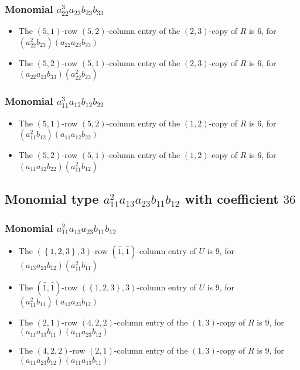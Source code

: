\documentclass{article}
\begin{document}
\subsubsection{Monomial $ a_{22}^{3} a_{23} b_{23} b_{33} $}

\begin{itemize}
\item The $(5, 1)$-row $(5, 2)$-column entry of the $ \left(2, 3\right) $-copy of $R$ is $ 6 $, for $( a_{22}^{2} b_{23} )( a_{22} a_{23} b_{33} )$ 
\item The $(5, 2)$-row $(5, 1)$-column entry of the $ \left(2, 3\right) $-copy of $R$ is $ 6 $, for $( a_{22} a_{23} b_{33} )( a_{22}^{2} b_{23} )$ 
\end{itemize}
\subsubsection{Monomial $ a_{11}^{3} a_{12} b_{12} b_{22} $}

\begin{itemize}
\item The $(5, 1)$-row $(5, 2)$-column entry of the $ \left(1, 2\right) $-copy of $R$ is $ 6 $, for $( a_{11}^{2} b_{12} )( a_{11} a_{12} b_{22} )$ 
\item The $(5, 2)$-row $(5, 1)$-column entry of the $ \left(1, 2\right) $-copy of $R$ is $ 6 $, for $( a_{11} a_{12} b_{22} )( a_{11}^{2} b_{12} )$ 
\end{itemize}
\subsection{Monomial type $ a_{11}^{2} a_{13} a_{23} b_{11} b_{12} $ with coefficient $ 36 $}

\subsubsection{Monomial $ a_{11}^{2} a_{13} a_{23} b_{11} b_{12} $}

\begin{itemize}
\item The $ \left(\left\{1, 2, 3\right\}, 3\right) $-row $ (\hat{1}, \hat{1}) $-column entry of $U$ is $ 9 $, for $( a_{13} a_{23} b_{12} )( a_{11}^{2} b_{11} )$ 
\item The $(\hat{1}, \hat{1})$-row $ \left(\left\{1, 2, 3\right\}, 3\right) $-column entry of $U$ is $ 9 $, for $( a_{11}^{2} b_{11} )( a_{13} a_{23} b_{12} )$ 
\item The $(2, 1)$-row $(4, 2, 2)$-column entry of the $ \left(1, 3\right) $-copy of $R$ is $ 9 $, for $( a_{11} a_{13} b_{11} )( a_{11} a_{23} b_{12} )$ 
\item The $(4, 2, 2)$-row $(2, 1)$-column entry of the $ \left(1, 3\right) $-copy of $R$ is $ 9 $, for $( a_{11} a_{23} b_{12} )( a_{11} a_{13} b_{11} )$ 
\end{itemize}
\end{document}
